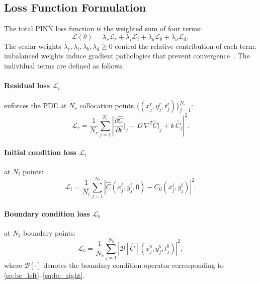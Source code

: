 \documentclass[pdflatex,sn-basic,Numbered]{sn-jnl}
\theoremstyle{thmstyleone}
\theoremstyle{thmstyletwo}
\begin{document}
\subsection{Loss Function Formulation}
\label{sec:loss}

The total PINN loss function is the weighted sum of four terms:
\begin{equation}
  \mathcal{L}(\theta) = \lambda_r \mathcal{L}_r
  + \lambda_i \mathcal{L}_i
  + \lambda_b \mathcal{L}_b
  + \lambda_d \mathcal{L}_d,
  \label{eq:loss_total}
\end{equation}
The scalar weights $\lambda_r, \lambda_i, \lambda_b, \lambda_d \ge 0$
control the relative contribution of each term; imbalanced
weights induce gradient pathologies that prevent
convergence~\cite{Wang2021}. The individual terms are defined
as follows.

\paragraph{Residual loss $\mathcal{L}_r$} enforces the PDE
at $N_r$ collocation points
$\{(x_j^r, y_j^r, t_j^r)\}_{j=1}^{N_r}$:
\begin{equation}
  \mathcal{L}_r = \frac{1}{N_r} \sum_{j=1}^{N_r}
  \left| \frac{\partial \hat{C}}{\partial t}\bigg|_j
  - D\,\nabla^2 \hat{C}\bigg|_j
  + k\,\hat{C}_j \right|^2.
  \label{eq:loss_r}
\end{equation}

\paragraph{Initial condition loss $\mathcal{L}_i$} at
$N_i$ points:
\begin{equation}
  \mathcal{L}_i = \frac{1}{N_i} \sum_{j=1}^{N_i}
  \left| \hat{C}(x_j^i, y_j^i, 0) - C_0(x_j^i, y_j^i) \right|^2.
  \label{eq:loss_i}
\end{equation}

\paragraph{Boundary condition loss $\mathcal{L}_b$} at
$N_b$ boundary points:
\begin{equation}
  \mathcal{L}_b = \frac{1}{N_b} \sum_{j=1}^{N_b}
  \left| \mathcal{B}[\hat{C}](x_j^b, y_j^b, t_j^b) \right|^2,
  \label{eq:loss_b}
\end{equation}
where $\mathcal{B}[\cdot]$ denotes the boundary condition
operator corresponding to \eqref{eq:bc_left}--\eqref{eq:bc_right}.
\end{document}

